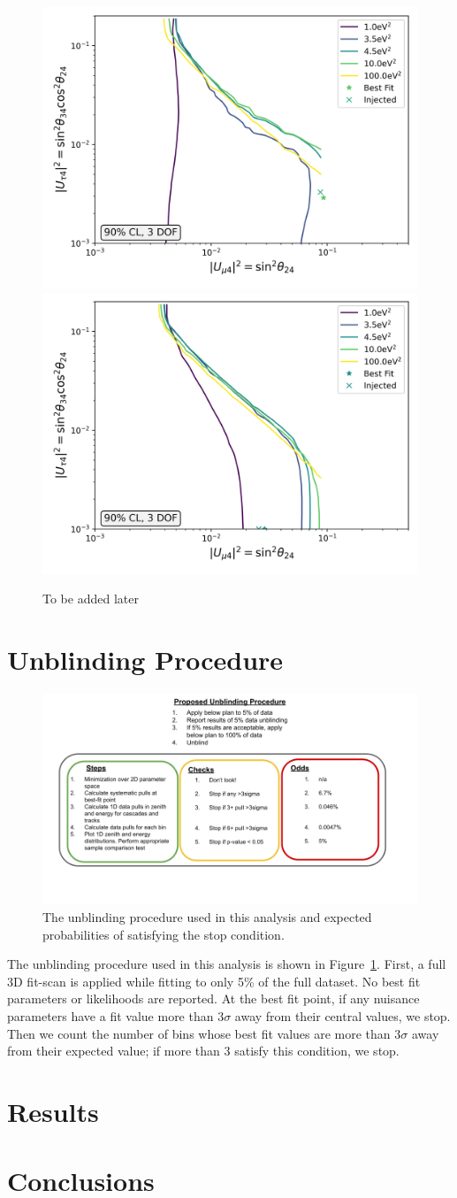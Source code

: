 \documentclass[main.tex]{subfiles}
\begin{document}
\begin{figure}
    \centering
    \includegraphics[width=0.45\linewidth]{figures/inject_recover_RealIR_8_sterile_7_cl0.9_dof3.png}%
    \includegraphics[width=0.45\linewidth]{figures/inject_recover_RealIR_9_sterile_4_cl0.9_dof3.png}
    \caption{To be added later}
\end{figure}

\section{Unblinding Procedure}

\begin{figure}
    \centering
    \includegraphics[width=0.7\linewidth]{figures/unblinding.png}
    \caption{The unblinding procedure used in this analysis and expected probabilities of satisfying the stop condition.}\label{fig:unblind}
\end{figure}

The unblinding procedure used in this analysis is shown in Figure~\ref{fig:unblind}. 
First, a full 3D fit-scan is applied while fitting to only 5\% of the full dataset. 
No best fit parameters or likelihoods are reported. 
At the best fit point, if any nuisance parameters have a fit value more than $3\sigma$ away from their central values, we stop. 
Then we count the number of bins whose best fit values are more than $3\sigma$ away from their expected value; if more than 3 satisfy this condition, we stop. 


\section{Results}

\section{Conclusions}
\end{document}

